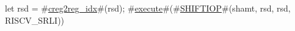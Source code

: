 let rsd = #\hyperref[sailRISCVzcreg2regzyidx]{creg2reg\_idx}#(rsd);
#\hyperref[sailRISCVzexecute]{execute}#(#\hyperref[sailRISCVzSHIFTIOP]{SHIFTIOP}#(shamt, rsd, rsd, RISCV_SRLI))
